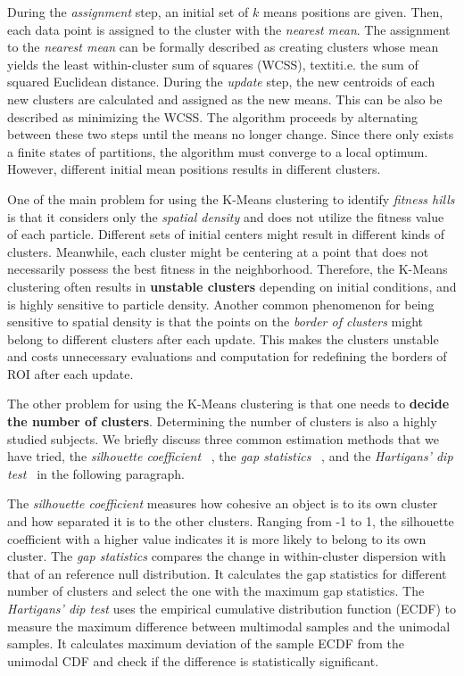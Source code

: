 During the \textit{assignment} step, an initial set of $k$ means positions are given.
Then, each data point is assigned to the cluster with the \textit{nearest mean}.
The assignment to the \textit{nearest mean} can be formally described 
as creating clusters whose mean yields the least within-cluster sum of squares (WCSS), textit{i.e.} the sum of squared Euclidean distance.
During the \textit{update} step, the new centroids of each new clusters are calculated and assigned as the new means.
This can be also be described as minimizing the WCSS.
The algorithm proceeds by alternating between these two steps until the means no longer change.
Since there only exists a finite states of partitions, the algorithm must converge to a local optimum.
However, different initial mean positions results in different clusters.

One of the main problem for using the K-Means clustering to identify \textit{fitness hills} is that
it considers only the \textit{spatial density} and does not utilize the fitness value of each particle.
Different sets of initial centers might result in different kinds of clusters.
Meanwhile, each cluster might be centering at a point that does not necessarily possess the best fitness in the neighborhood.
Therefore, the K-Means clustering often results in \textbf{unstable clusters} depending on initial conditions, and is highly sensitive to particle density.
Another common phenomenon for being sensitive to spatial density is that 
the points on the \textit{border of clusters} might belong to different clusters after each update.
This makes the clusters unstable and costs unnecessary evaluations and computation for redefining the borders of ROI after each update. 

The other problem for using the K-Means clustering is that one needs to \textbf{decide the number of clusters}.
Determining the number of clusters is also a highly studied subjects.
We briefly discuss three common estimation methods that we have tried, 
the \textit{silhouette coefficient}~\cite{Rousseeuw:1987:silhouettes}
, the \textit{gap statistics}~\cite{Tibshirani:2001:gap}
, and the \textit{Hartigans' dip test}~\cite{Hartigan:1985:dip}
in the following paragraph.

The \textit{silhouette coefficient} measures how cohesive an object is to its own cluster and how separated it is to the other clusters. Ranging from -1 to 1, the silhouette coefficient with a higher value indicates it is more likely to belong to its own cluster.
The \textit{gap statistics} compares the change in within-cluster dispersion with that of an reference null distribution.
It calculates the gap statistics for different number of clusters and select the one with the maximum gap statistics.
The \textit{Hartigans' dip test} uses the empirical cumulative distribution function (ECDF) to measure the maximum difference between multimodal samples and the unimodal samples. It calculates maximum deviation of the sample ECDF from the unimodal CDF and check if the difference is statistically significant.


